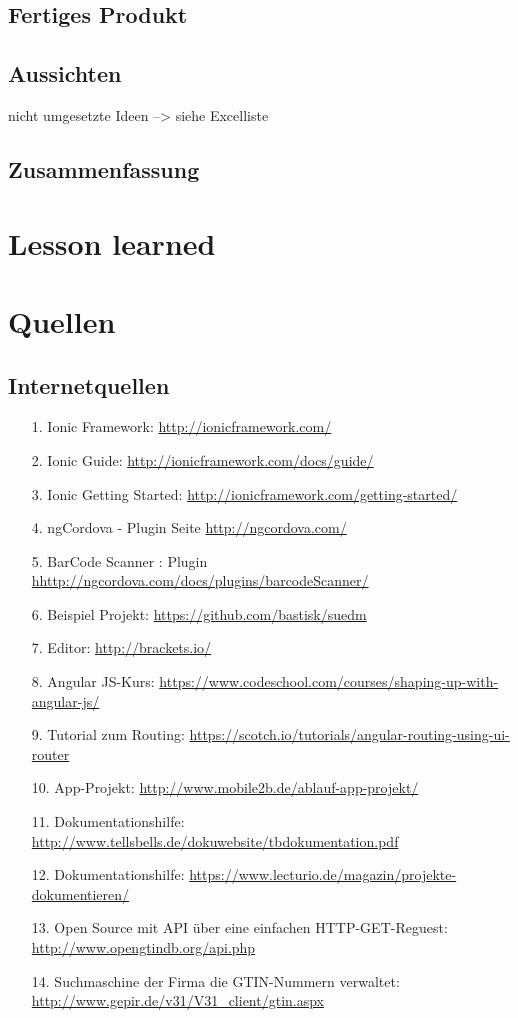 \documentclass[12pt,a4paper]{article}
\begin{document}
\subsection{Fertiges Produkt}
\subsection{Aussichten}
nicht umgesetzte Ideen --> siehe Excelliste
\newpage
\subsection{Zusammenfassung}
\newpage
\section{Lesson learned}
\newpage
\section*{Quellen}
\subsection*{Internetquellen}
\begin{itemize}
\item[1.]Ionic Framework: \url{http://ionicframework.com/}
\item[2.]Ionic Guide: \url{http://ionicframework.com/docs/guide/}
\item[3.]Ionic Getting Started: \url{http://ionicframework.com/getting-started/}
\item[4.]ngCordova - Plugin Seite \url{http://ngcordova.com/}
\item[5.]BarCode Scanner : Plugin \url{hhttp://ngcordova.com/docs/plugins/barcodeScanner/}
\item[6.]Beispiel Projekt: \url{https://github.com/bastisk/suedm}
\item[7.]Editor: \url{http://brackets.io/}
\item[8.]Angular JS-Kurs: \url{https://www.codeschool.com/courses/shaping-up-with-angular-js/}
\item[9.]Tutorial zum Routing: \url{https://scotch.io/tutorials/angular-routing-using-ui-router}
\item[10.]App-Projekt: \url{http://www.mobile2b.de/ablauf-app-projekt/}
\item[11.] Dokumentationshilfe: \url{http://www.tellsbells.de/dokuwebsite/tbdokumentation.pdf}
\item[12.] Dokumentationshilfe: \url{https://www.lecturio.de/magazin/projekte-dokumentieren/}
\item[13.] Open Source mit API über eine einfachen HTTP-GET-Reguest: \url{http://www.opengtindb.org/api.php}
\item[14.] Suchmaschine der Firma die GTIN-Nummern verwaltet: \url{http://www.gepir.de/v31/V31_client/gtin.aspx}
\end{itemize}
\end{document}
